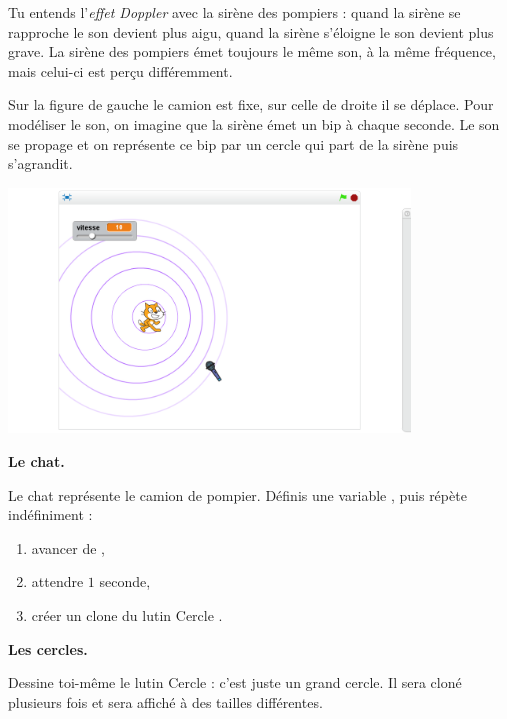 \documentclass[class=report,crop=false, 12pt]{standalone}
\begin{document}
\begin{activite}

Tu entends l'\emph{effet Doppler} avec la sirène des pompiers : quand la sirène se rapproche le son devient plus aigu, quand la sirène s'éloigne le son devient plus grave.
La sirène des pompiers émet toujours le même son, à la même fréquence, mais celui-ci est perçu différemment. 


Sur la figure de gauche le camion est fixe, sur celle de droite il se déplace.
Pour modéliser le son, on imagine que la sirène émet un \og bip \fg{} à chaque seconde.
Le son se propage et on représente ce \og bip \fg{} par un cercle qui part de la sirène puis s'agrandit.

\begin{center}
  \includegraphics[width=0.8\textwidth]{ecran-09-ex3} 
\end{center}


\bigskip

\textbf{Le chat.}

Le chat représente le camion de pompier.
Définis une variable , puis répète indéfiniment :

\begin{enumerate}
  \item avancer de ,
  \item attendre $1$ seconde,
  \item créer un clone du lutin \og Cercle \fg{}.
\end{enumerate}

\bigskip

\textbf{Les cercles.}

Dessine toi-même le lutin \og Cercle \fg{} : c'est juste un grand cercle. 
Il sera cloné plusieurs fois et sera affiché à des tailles différentes.


\end{activite}
\end{document}
